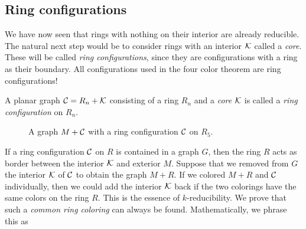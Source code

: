 \subsection{Ring configurations}

We have now seen that rings with nothing on their interior are already reducible. The natural next step would be to consider rings with an interior $\mathcal{K}$ called a \textit{core}. These will be called \textit{ring configurations}, since they are configurations with a ring as their boundary. All configurations used in the four color theorem are ring configurations!

\begin{definition}
    A planar graph $\mathcal{C} = R_n + \mathcal{K}$ consisting of a ring $R_n$ and a \emph{core} $\mathcal{K}$ is called a \emph{ring configuration} on $R_n$.
\end{definition}

\begin{figure}[!h]
    \centering
    \caption{A graph $M+\mathcal{C}$ with a ring configuration $\mathcal{C}$ on $R_5$.}
\end{figure}

If a ring configuration $\mathcal{C}$ on $R$ is contained in a graph $G$, then the ring $R$ acts as border between the interior $\mathcal{K}$ and exterior $M$. Suppose that we removed from $G$ the interior $\mathcal{K}$ of $\mathcal{C}$ to obtain the graph $M+R$. If we colored $M+R$ and $\mathcal{C}$ individually, then we could add the interior $\mathcal{K}$ back if the two colorings have the same colors on the ring $R$. This is the essence of $k$-reducibility. We prove that such a \textit{common ring coloring} can always be found. Mathematically, we phrase this as 

